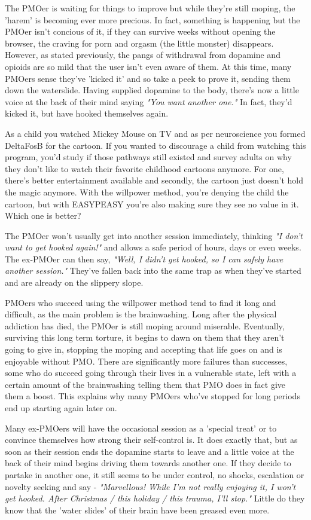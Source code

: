 \documentclass[easypeasy.tex]{subfiles}
\begin{document}
The PMOer is waiting for things to improve but while they're still moping, the 'harem' is becoming ever more precious. In fact, something is happening but the PMOer isn't concious of it, if they can survive weeks without opening the browser, the craving for porn and orgasm (the little monster) disappears. However, as stated previously, the pangs of withdrawal from dopamine and opioids are so mild that the user isn't even aware of them. At this time, many PMOers sense they've 'kicked it' and so take a peek to prove it, sending them down the waterslide. Having supplied dopamine to the body, there's now a little voice at the back of their mind saying \textit{"You want another one."} In fact, they'd kicked it, but have hooked themselves again.

As a child you watched Mickey Mouse on TV and as per neuroscience you formed DeltaFosB for the cartoon. If you wanted to discourage a child from watching this program, you'd study if those pathways still existed and survey adults on why they don't like to watch their favorite childhood cartoons anymore. For one, there's better entertainment available and secondly, the cartoon just doesn't hold the magic anymore. With the willpower method, you're denying the child the cartoon, but with EASYPEASY you're also making sure they see no value in it. Which one is better?

The PMOer won't usually get into another session immediately, thinking \textit{"I don't want to get hooked again!"} and allows a safe period of hours, days or even weeks. The ex-PMOer can then say, \textit{"Well, I didn't get hooked, so I can safely have another session."} They've fallen back into the same trap as when they've started and are already on the slippery slope.

PMOers who succeed using the willpower method tend to find it long and difficult, as the main problem is the brainwashing. Long after the physical addiction has died, the PMOer is still moping around miserable. Eventually, surviving this long term torture, it begins to dawn on them that they aren't going to give in, stopping the moping and accepting that life goes on and is enjoyable without PMO. There are significantly more failures than successes, some who do succeed going through their lives in a vulnerable state, left with a certain amount of the brainwashing telling them that PMO does in fact give them a boost. This explains why many PMOers who've stopped for long periods end up starting again later on.

Many ex-PMOers will have the occasional session as a 'special treat' or to convince themselves how strong their self-control is. It does exactly that, but as soon as their session ends the dopamine starts to leave and a little voice at the back of their mind begins driving them towards another one. If they decide to partake in another one, it still seems to be under control, no shocks, escalation or novelty seeking and say - \textit{"Marvellous! While I'm not really enjoying it, I won't get hooked. After Christmas / this holiday / this trauma, I'll stop."} Little do they know that the 'water slides' of their brain have been greased even more.
\end{document}
